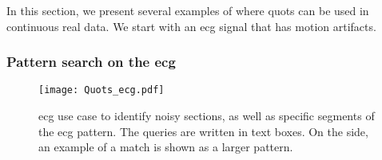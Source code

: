 In this section, we present several examples of where \gls{quots} can be used in continuous real data. We start with an \gls{ecg} signal that has motion artifacts.

\subsubsection{Pattern search on the \gls{ecg}}

\begin{figure}
\texttt{[image: Quots\_ecg.pdf]}
\caption{\gls{ecg} use case to identify noisy sections, as well as specific segments of the \gls{ecg} pattern. The queries are written in text boxes. On the side, an example of a match is shown as a larger pattern.}
\label{fig:ecg_use_case1}
\end{figure}

